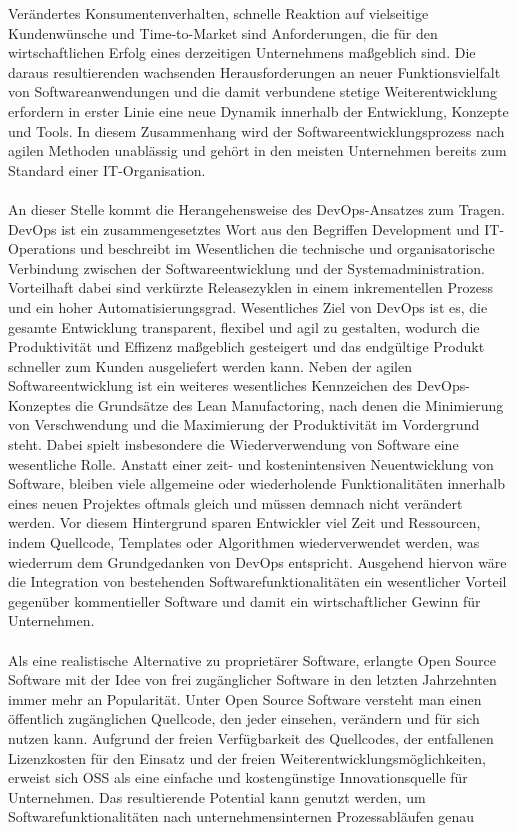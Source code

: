 Verändertes Konsumentenverhalten, schnelle Reaktion auf vielseitige Kundenwünsche und Time-to-Market sind Anforderungen, die für den wirtschaftlichen Erfolg eines derzeitigen Unternehmens maßgeblich sind. Die daraus resultierenden wachsenden Herausforderungen an neuer Funktionsvielfalt von Softwareanwendungen und die damit verbundene stetige Weiterentwicklung erfordern in erster Linie eine neue Dynamik innerhalb der Entwicklung, Konzepte und Tools. In diesem Zusammenhang wird der Softwareentwicklungsprozess nach agilen Methoden unablässig und gehört in den meisten Unternehmen bereits zum Standard einer IT-Organisation. \\\\ An dieser Stelle kommt die Herangehensweise des DevOps-Ansatzes zum Tragen. DevOps ist ein zusammengesetztes Wort aus den Begriffen Development und IT-Operations und beschreibt im Wesentlichen die technische und organisatorische Verbindung zwischen der Softwareentwicklung und der Systemadministration. \cite[S.23]{alt_innovationsorientiertes_2017} Vorteilhaft dabei sind verkürzte Releasezyklen in einem inkrementellen Prozess und ein hoher Automatisierungsgrad. Wesentliches Ziel von DevOps ist es, die gesamte Entwicklung transparent, flexibel und agil zu gestalten, wodurch die Produktivität und Effizenz maßgeblich gesteigert und das endgültige Produkt schneller zum Kunden ausgeliefert werden kann.\cite{hemon_agile_2020} Neben der agilen Softwareentwicklung ist ein weiteres wesentliches Kennzeichen des DevOps-Konzeptes die Grundsätze des Lean Manufactoring, nach denen die Minimierung von Verschwendung und die Maximierung der Produktivität im Vordergrund steht.\cite{samulat_raus_2017} Dabei spielt insbesondere die Wiederverwendung von Software eine wesentliche Rolle. \cite[S. 140 - 141]{poppendieck_lean_2010} \cite[S. 38]{ravichandran_devops_2016} Anstatt einer zeit- und kostenintensiven Neuentwicklung von Software, bleiben viele allgemeine oder wiederholende Funktionalitäten innerhalb eines neuen Projektes oftmals gleich und müssen demnach nicht verändert werden. Vor diesem Hintergrund sparen Entwickler viel Zeit und Ressourcen, indem Quellcode, Templates oder Algorithmen wiederverwendet werden, was wiederrum dem Grundgedanken von DevOps entspricht. Ausgehend hiervon wäre die Integration von bestehenden Softwarefunktionalitäten ein wesentlicher Vorteil gegenüber kommentieller Software und damit ein wirtschaftlicher Gewinn für Unternehmen. \\\\ Als eine realistische Alternative zu proprietärer Software, erlangte Open Source Software mit der Idee von frei zugänglicher Software in den letzten Jahrzehnten immer mehr an Popularität.\cite[S. 21,22]{allmann_open_2019} Unter Open Source Software versteht man einen öffentlich zugänglichen Quellcode, den jeder einsehen, verändern und für sich nutzen kann. Aufgrund der freien Verfügbarkeit des Quellcodes, der entfallenen Lizenzkosten für den Einsatz und der freien Weiterentwicklungsmöglichkeiten, erweist sich OSS als eine einfache und kostengünstige Innovationsquelle für Unternehmen. Das resultierende Potential kann genutzt werden, um Softwarefunktionalitäten nach unternehmensinternen Prozessabläufen genau 